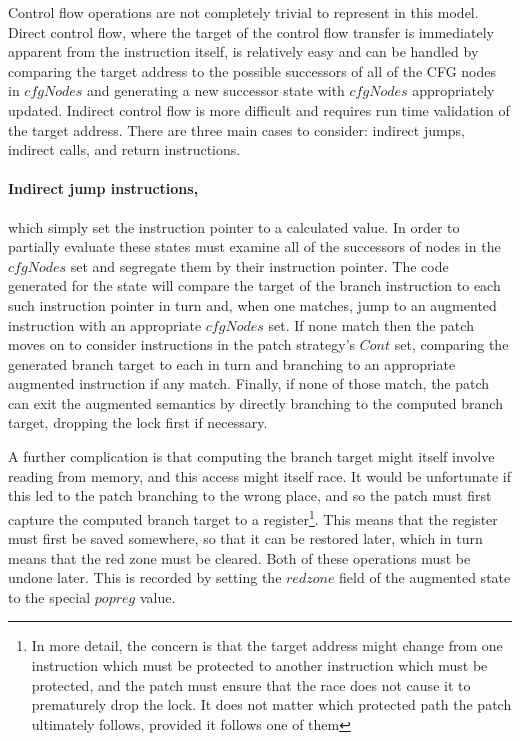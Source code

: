Control flow operations are not completely trivial to represent in
this model.  Direct control flow, where the target of the control flow
transfer is immediately apparent from the instruction itself, is
relatively easy and can be handled by comparing the target address to
the possible successors of all of the CFG nodes in $cfgNodes$ and
generating a new successor state with $cfgNodes$ appropriately
updated.  Indirect control flow is more difficult and requires run
time validation of the target address.  There are three main cases to
consider: indirect jumps, indirect calls, and return instructions.

\paragraph{Indirect jump instructions,} which simply set the instruction pointer
to a calculated value.  In order to partially evaluate these states
{\technique} must examine all of the successors of nodes in the
$cfgNodes$ set and segregate them by their instruction pointer.  The
code generated for the state will compare the target of the branch
instruction to each such instruction pointer in turn and, when one
matches, jump to an augmented instruction with an appropriate
$cfgNodes$ set.  If none match then the patch moves on to consider
instructions in the patch strategy's $Cont$ set, comparing the
generated branch target to each in turn and branching to an
appropriate augmented instruction if any match.  Finally, if none of
those match, the patch can exit the augmented semantics by directly
branching to the computed branch target, dropping the lock first if
necessary.

A further complication is that computing the branch target might
itself involve reading from memory, and this access might itself race.
It would be unfortunate if this led to the patch branching to the
wrong place, and so the patch must first capture the computed branch
target to a register\footnote{In more detail, the concern is that the
  target address might change from one instruction which must be
  protected to another instruction which must be protected, and the
  patch must ensure that the race does not cause it to prematurely
  drop the lock.  It does not matter which protected path the patch
  ultimately follows, provided it follows one of them}.  This means
that the register must first be saved somewhere, so that it can be
restored later, which in turn means that the red zone must be cleared.
Both of these operations must be undone later.  This is recorded by
setting the $redzone$ field of the augmented state to the special
$popreg$ value.

